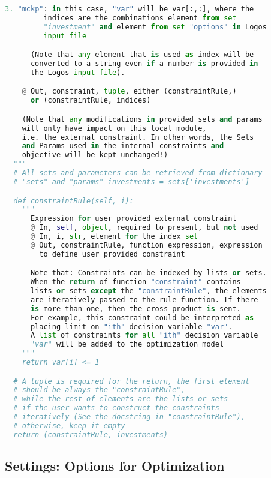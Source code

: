 \begin{lstlisting}[language=python]
      3. "mckp": in this case, "var" will be var[:,:], where the
         indices are the combinations element from set
         "investment" and element from set "options" in Logos
         input file

      (Note that any element that is used as index will be
      converted to a string even if a number is provided in
      the Logos input file).

    @ Out, constraint, tuple, either (constraintRule,)
      or (constraintRule, indices)

    (Note that any modifications in provided sets and params
    will only have impact on this local module,
    i.e. the external constraint. In other words, the Sets
    and Params used in the internal constraints and
    objective will be kept unchanged!)
  """
  # All sets and parameters can be retrieved from dictionary
  # "sets" and "params" investments = sets['investments']

  def constraintRule(self, i):
    """
      Expression for user provided external constraint
      @ In, self, object, required to present, but not used
      @ In, i, str, element for the index set
      @ Out, constraintRule, function expression, expression
        to define user provided constraint

      Note that: Constraints can be indexed by lists or sets.
      When the return of function "constraint" contains
      lists or sets except the "constraintRule", the elements
      are iteratively passed to the rule function. If there
      is more than one, then the cross product is sent.
      For example, this constraint could be interpreted as
      placing limit on "ith" decision variable "var".
      A list of constraints for all "ith" decision variable
      "var" will be added to the optimization model
    """
    return var[i] <= 1

  # A tuple is required for the return, the first element
  # should be always the "constraintRule",
  # while the rest of elements are the lists or sets
  # if the user wants to construct the constraints
  # iteratively (See the docstring in "constraintRule"),
  # otherwise, keep it empty
  return (constraintRule, investments)
\end{lstlisting}

%
\subsection{Settings: Options for Optimization}
\label{subsec:Settings}

